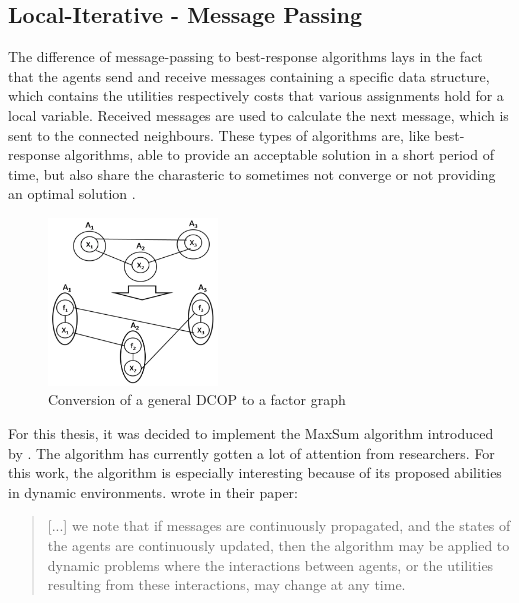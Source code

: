 \subsection{Local-Iterative - Message Passing}
The difference of message-passing to best-response algorithms lays in the fact that the agents send and receive messages containing a specific data structure, which contains the utilities respectively costs that various assignments hold for a local variable. Received messages are used to calculate the next message, which is sent to the connected neighbours. These types of algorithms are, like best-response algorithms, able to provide an acceptable solution in a short period of time, but also share the charasteric to sometimes not converge or not providing an optimal solution \cite{Chapman2011}.
\begin{figure}[H]
\centering
\includegraphics[width=170px]{graphics/factorgraph}
\caption{Conversion of a general DCOP to a factor graph \cite{Zivan2012}}
\label{fig:factorgraph}
\end{figure}

For this thesis, it was decided to implement the MaxSum algorithm introduced by \cite{Farinelli2008}. The algorithm has currently gotten a lot of attention from researchers. For this work, the algorithm is especially interesting because of its proposed abilities in dynamic environments.  \cite{Farinelli2008} wrote in their paper:
\begin{quote}
[...] we note that if messages are continuously propagated,
and the states of the agents are continuously updated, then the algorithm may be applied to dynamic problems where the interactions between agents, or the utilities resulting from these interactions, may change at any time.
\end{quote}

